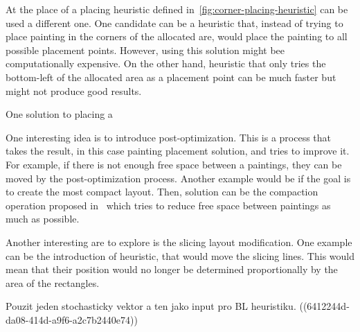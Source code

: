 
At the place of a placing heuristic defined in~\ref{fig:corner-placing-heuristic} can be used a different one.
One candidate can be a heuristic that, instead of trying to place painting in the corners of the allocated are,
would place the painting to all possible placement points.
However, using this solution might bee computationally expensive.
On the other hand, heuristic that only tries the bottom-left of the allocated area as a placement point can be much faster but
might not produce good results.

One solution to placing a


One interesting idea is to introduce post-optimization.
This is a process that takes the result, in this case painting placement solution,
and tries to improve it.
For example, if there is not enough free space between a paintings, they can be moved by the post-optimization process.
Another example would be if the goal is to create the most compact layout.
Then, solution can be the compaction operation proposed in~\cite{laiSlicingTreeComplete2001}
which tries to reduce free space between paintings as much as possible.


Another interesting are to explore is the slicing layout modification.
One example can be the introduction of heuristic, that would move the slicing lines.
This would mean that their position would no longer be determined proportionally by the area of the rectangles.


Pouzit jeden stochasticky vektor a ten jako input pro BL heuristiku.
((6412244d-da08-414d-a9f6-a2c7b2440e74))






